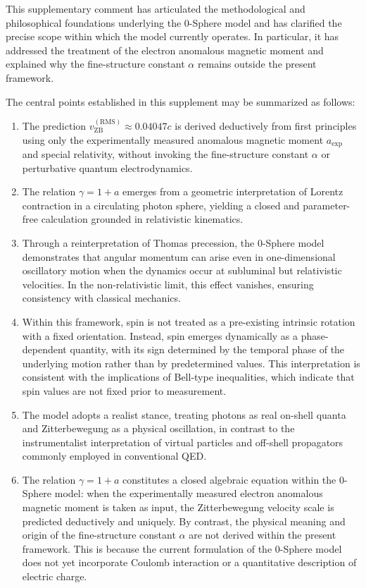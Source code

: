 \documentclass[12pt,letterpaper]{article}
\begin{document}
\justifying
This supplementary comment has articulated the methodological and philosophical foundations underlying the 0-Sphere model and has clarified the precise scope within which the model currently operates. In particular, it has addressed the treatment of the electron anomalous magnetic moment and explained why the fine-structure constant $\alpha$ remains outside the present framework.

The central points established in this supplement may be summarized as follows:

\begin{enumerate}
\item The prediction $v_{\mathrm{ZB}}^{(\mathrm{RMS})} \approx 0.04047c$ is derived deductively from first principles using only the experimentally measured anomalous magnetic moment $a_{\mathrm{exp}}$ and special relativity, without invoking the fine-structure constant $\alpha$ or perturbative quantum electrodynamics.

\item The relation $\gamma = 1 + a$ emerges from a geometric interpretation of Lorentz contraction in a circulating photon sphere, yielding a closed and parameter-free calculation grounded in relativistic kinematics.

\item Through a reinterpretation of Thomas precession, the 0-Sphere model demonstrates that angular momentum can arise even in one-dimensional oscillatory motion when the dynamics occur at subluminal but relativistic velocities. In the non-relativistic limit, this effect vanishes, ensuring consistency with classical mechanics.

\item Within this framework, spin is not treated as a pre-existing intrinsic rotation with a fixed orientation. Instead, spin emerges dynamically as a phase-dependent quantity, with its sign determined by the temporal phase of the underlying motion rather than by predetermined values. This interpretation is consistent with the implications of Bell-type inequalities, which indicate that spin values are not fixed prior to measurement.

\item The model adopts a realist stance, treating photons as real on-shell quanta and Zitterbewegung as a physical oscillation, in contrast to the instrumentalist interpretation of virtual particles and off-shell propagators commonly employed in conventional QED.

\item The relation $\gamma = 1 + a$ constitutes a closed algebraic equation within the 0-Sphere model: when the experimentally measured electron anomalous magnetic moment is taken as input, the Zitterbewegung velocity scale is predicted deductively and uniquely. By contrast, the physical meaning and origin of the fine-structure constant $\alpha$ are not derived within the present framework. This is because the current formulation of the 0-Sphere model does not yet incorporate Coulomb interaction or a quantitative description of electric charge.


\end{enumerate}
\end{document}
